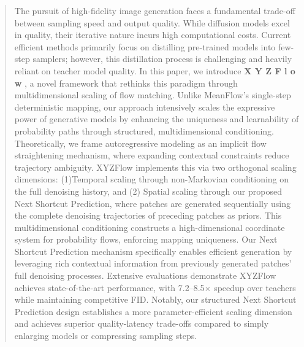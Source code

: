 \documentclass{article}
\theoremstyle{plain}
\theoremstyle{definition}
\theoremstyle{remark}
\newcommand{\XYZFlow}{%
    \textcolor{blue!40!purple!60}{X}%
    \textcolor{cyan!40!green!50}{Y}%
    \textcolor{yellow!40!orange}{Z}%
    \textcolor{blue!65!black}{F}%
    \textcolor{cyan!60!black}{l}%
    \textcolor{green!55!black}{o}%
    \textcolor{yellow!65!black}{w}%
}
\begin{document}
\begin{abstract}
The pursuit of high-fidelity image generation faces a fundamental trade-off between sampling speed and output quality. While diffusion models excel in quality, their iterative nature incurs high computational costs. Current efficient methods primarily focus on distilling pre-trained models into few-step samplers; however, this distillation process is challenging and heavily reliant on teacher model quality. In this paper, we introduce \textbf{\XYZFlow}, a novel framework that rethinks this paradigm through multidimensional scaling of flow matching. Unlike MeanFlow's single-step deterministic mapping, our approach intensively scales the expressive power of generative models by enhancing the uniqueness and learnability of probability paths through structured, multidimensional conditioning. Theoretically, we frame autoregressive modeling as an implicit flow straightening mechanism, where expanding contextual constraints reduce trajectory ambiguity. XYZFlow implements this via two orthogonal scaling dimensions: 
(1)Temporal scaling through non-Markovian conditioning on the full denoising history, and 
(2) Spatial scaling through our proposed Next Shortcut Prediction, where patches are generated sequentially using the complete denoising trajectories of preceding patches as priors. 
This multidimensional conditioning constructs a high-dimensional coordinate system for probability flows, enforcing mapping uniqueness. Our Next Shortcut Prediction mechanism specifically enables efficient generation by leveraging rich contextual information from previously generated patches' full denoising processes.
Extensive evaluations demonstrate XYZFlow achieves state-of-the-art performance, with 7.2--8.5$\times$ speedup over teachers while maintaining competitive FID. Notably, our structured Next Shortcut Prediction design establishes a more parameter-efficient scaling dimension and achieves superior quality-latency trade-offs compared to simply enlarging models or compressing sampling steps.

\vspace{-5mm}



\end{abstract}
\end{document}
